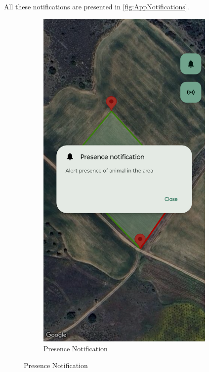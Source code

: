 \begin{enumerate}
    All these notifications are presented in \autoref{fig:AppNotifications}.
        \begin{figure}[H]
            \centering
            \begin{subfigure}[t]{0.3\textwidth}
                \centering
                \includegraphics[width=0.95\textwidth]{images/8/08.png}
                \caption{Presence Notification}

\end{subfigure}
\end{figure}
\end{enumerate}
